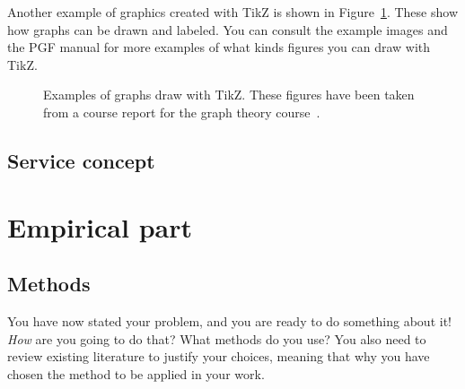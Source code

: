 \documentclass[12pt,a4paper,oneside,pdftex]{report}
\begin{document}
Another example of graphics created with TikZ is shown in
Figure~\ref{fig:tikz-examples}.
These show how graphs can be drawn and labeled.
You can consult the example images and the PGF manual for more examples of what
kinds figures you can draw with TikZ.

\newlength{\graphdotsize}
\setlength{\graphdotsize}{1.7pt}
\newlength{\graphgridsize}
\setlength{\graphgridsize}{1.2em}
\begin{figure}[ht]
\begin{center}
\caption{Examples of graphs draw with TikZ. These figures have been taken from a
course report for the graph theory course~\cite{FerryProblem}.}
\label{fig:tikz-examples}
\end{center}
\end{figure}

\section{Service concept}

% 

\chapter{Empirical part}
\label{chapter:methods}
\section{Methods}

You have now stated your problem, and you are ready to do something
about it!  \emph{How} are you going to do that? What methods do you
use?  You also need to review existing literature to justify your
choices, meaning that why you have chosen the method to be applied in
your work.
\end{document}
